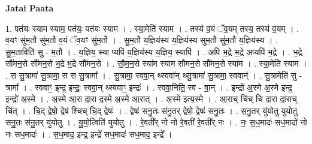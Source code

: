 \documentclass[17pt]{extarticle}
\begin{document}
\textbf{Jatai Paata} \newline

1. पत॑यः स्याम स्याम॒ पत॑यः॒ पत॑यः स्याम । . स्या॒मेति॑ स्याम । . तस्य॑ व॒यं ॅव॒यम् तस्य॒ तस्य॑ व॒यम् । . व॒यꣳ सु॑म॒तौ सु॑म॒तौ व॒यं ॅव॒यꣳ सु॑म॒तौ । . सु॒म॒तौ य॒ज्ञिय॑स्य य॒ज्ञिय॑स्य सुम॒तौ सु॑म॒तौ य॒ज्ञिय॑स्य । . सु॒म॒ताविति॑ सु - म॒तौ । . य॒ज्ञिय॒ स्या प्यपि॑ य॒ज्ञिय॑स्य य॒ज्ञिय॒ स्यापि॑ । . अपि॑ भ॒द्रे भ॒द्रे अप्यपि॑ भ॒द्रे । . भ॒द्रे सौ॑मन॒से सौ॑मन॒से भ॒द्रे भ॒द्रे सौ॑मन॒से । . सौ॒म॒न॒से स्या॑म स्याम सौमन॒से सौ॑मन॒से स्या॑म । . स्या॒मेति॑ स्याम । . स सु॒त्रामा॑ सु॒त्रामा॒ स स सु॒त्रामा᳚ । . सु॒त्रामा॒ स्ववा॒न् थ्स्ववा᳚न् थ्सु॒त्रामा॑ सु॒त्रामा॒ स्ववान्॑ । . सु॒त्रामेति॑ सु - त्रामा᳚ । . स्ववाꣳ॒॒ इन्द्र॒ इन्द्रः॒ स्ववा॒न् थ्स्ववाꣳ॒॒ इन्द्रः॑ । . स्ववा॒निति॒ स्व - वा॒न् । . इन्द्रो॑ अ॒स्मे अ॒स्मे इन्द्र॒ इन्द्रो॑ अ॒स्मे । . अ॒स्मे आ॒रा दा॒रा द॒स्मे अ॒स्मे आ॒रात् । . अ॒स्मे इत्य॒स्मे । . आ॒राच् चि॑च् चि दा॒रा दा॒राच् चि॑त् । . चि॒द् द्वेषो॒ द्वेष॑ श्चिच् चि॒द् द्वेषः॑ । . द्वेषः॑ सनु॒तः स॑नु॒तर् द्वेषो॒ द्वेषः॑ सनु॒तः । . स॒नु॒तर् यु॑योतु युयोतु सनु॒तः स॑नु॒तर् यु॑योतु । . यु॒यो॒त्विति॑ युयोतु । . रे॒वती᳚र् नो नो रे॒वती॑ रे॒वती᳚र् नः । . नः॒ स॒ध॒मादः॑ सध॒मादो॑ नो नः सध॒मादः॑ । . स॒ध॒माद॒ इन्द्र॒ इन्द्रे॑ सध॒मादः॑ सध॒माद॒ इन्द्रे᳚ । \newline
\end{document}
